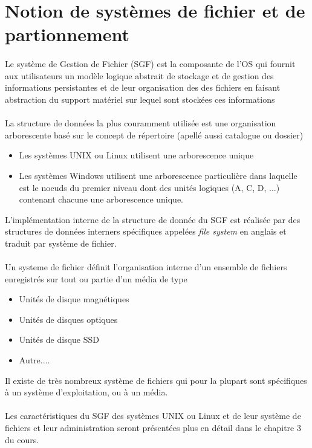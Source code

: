 \documentclass[12pt,a4paper,openany]{book}
\begin{document}
		\section{Notion de systèmes de fichier et de partionnement}
		\paragraph{}
			Le système de Gestion de Fichier (SGF) est la composante de l'OS
			qui fournit aux utilisateurs un modèle logique abstrait de stockage et 
			de gestion des informations persistantes et de leur organisation des 
			des fichiers en faisant abstraction du support matériel sur lequel
			sont stockées ces informations 
		\paragraph{}
			La structure de données la plus couramment utilisée est une organisation
			arborescente basé sur le concept de répertoire (apellé aussi catalogue
					ou dossier)
			\begin{itemize}
				\item Les systèmes UNIX ou Linux utilisent une arborescence unique
				\item Les systèmes Windows utilisent une arborescence particulière
				dans laquelle est le noeuds du premier niveau dont des unités 
				logiques (A, C, D, ...) contenant chacune une arborescence unique.
			\end{itemize}	
			L'implémentation interne de la structure de donnée du SGF est réalisée
			par des structures de données interners spécifiques appelées 
			\textit{file system} en anglais et traduit par système de fichier.
			\paragraph{}
			Un systeme de fichier définit l'organisation interne d'un ensemble
			de fichiers enregistrés sur tout ou partie d'un média de type
			\begin{itemize}
				\item Unités de disque magnétiques
				\item Unités de disques optiques
				\item Unités de disque SSD
				\item Autre....
			\end{itemize}
			Il existe de très nombreux système de fichiers qui pour la plupart
			sont spécifiques à un système d'exploitation, ou à un média.
			\paragraph{}
			Les caractéristiques du SGF des systèmes UNIX ou Linux et de leur
			système de fichiers et leur administration seront présentées plus
			en détail dans le chapitre 3 du cours.
\end{document}
